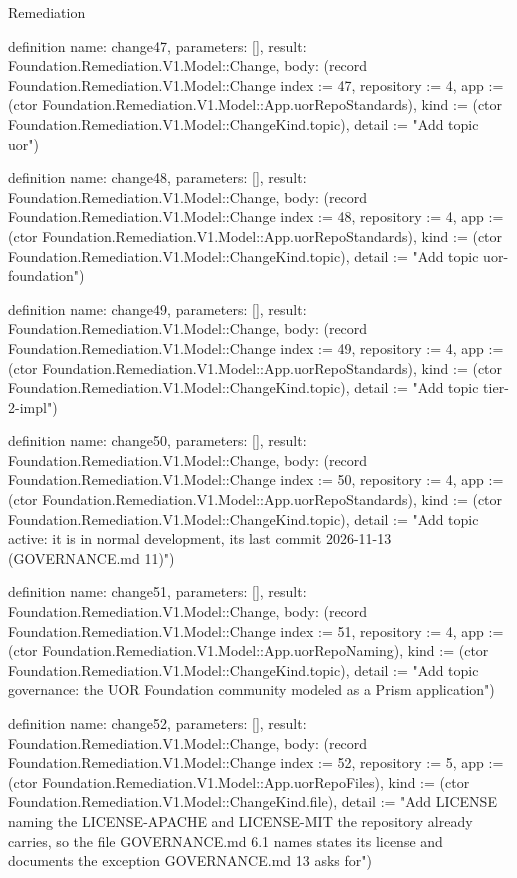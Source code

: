 \begin{lexlean}{Remediation}
\begin{semanticmodule}
definition{
  name: change47,
  parameters: [],
  result: Foundation.Remediation.V1.Model::Change,
  body: (record Foundation.Remediation.V1.Model::Change {index := 47, repository := 4, app := (ctor Foundation.Remediation.V1.Model::App.uorRepoStandards), kind := (ctor Foundation.Remediation.V1.Model::ChangeKind.topic), detail := "Add topic uor"})
}

definition{
  name: change48,
  parameters: [],
  result: Foundation.Remediation.V1.Model::Change,
  body: (record Foundation.Remediation.V1.Model::Change {index := 48, repository := 4, app := (ctor Foundation.Remediation.V1.Model::App.uorRepoStandards), kind := (ctor Foundation.Remediation.V1.Model::ChangeKind.topic), detail := "Add topic uor-foundation"})
}

definition{
  name: change49,
  parameters: [],
  result: Foundation.Remediation.V1.Model::Change,
  body: (record Foundation.Remediation.V1.Model::Change {index := 49, repository := 4, app := (ctor Foundation.Remediation.V1.Model::App.uorRepoStandards), kind := (ctor Foundation.Remediation.V1.Model::ChangeKind.topic), detail := "Add topic tier-2-impl"})
}

definition{
  name: change50,
  parameters: [],
  result: Foundation.Remediation.V1.Model::Change,
  body: (record Foundation.Remediation.V1.Model::Change {index := 50, repository := 4, app := (ctor Foundation.Remediation.V1.Model::App.uorRepoStandards), kind := (ctor Foundation.Remediation.V1.Model::ChangeKind.topic), detail := "Add topic active: it is in normal development, its last commit 2026-11-13 (GOVERNANCE.md 11)"})
}

definition{
  name: change51,
  parameters: [],
  result: Foundation.Remediation.V1.Model::Change,
  body: (record Foundation.Remediation.V1.Model::Change {index := 51, repository := 4, app := (ctor Foundation.Remediation.V1.Model::App.uorRepoNaming), kind := (ctor Foundation.Remediation.V1.Model::ChangeKind.topic), detail := "Add topic governance: the UOR Foundation community modeled as a Prism application"})
}

definition{
  name: change52,
  parameters: [],
  result: Foundation.Remediation.V1.Model::Change,
  body: (record Foundation.Remediation.V1.Model::Change {index := 52, repository := 5, app := (ctor Foundation.Remediation.V1.Model::App.uorRepoFiles), kind := (ctor Foundation.Remediation.V1.Model::ChangeKind.file), detail := "Add LICENSE naming the LICENSE-APACHE and LICENSE-MIT the repository already carries, so the file GOVERNANCE.md 6.1 names states its license and documents the exception GOVERNANCE.md 13 asks for"})
}


\end{semanticmodule}
\end{lexlean}

